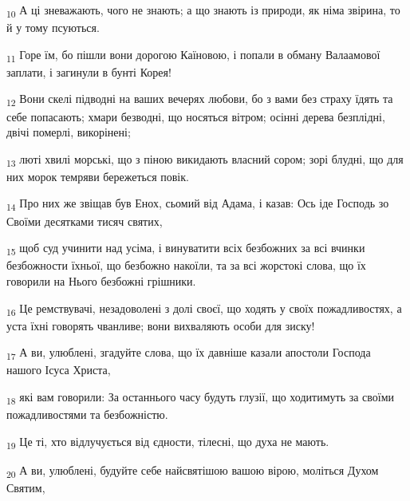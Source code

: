 \begin{tcolorbox}
\textsubscript{10} А ці зневажають, чого не знають; а що знають із природи, як німа звірина, то й у тому псуються.
\end{tcolorbox}
\begin{tcolorbox}
\textsubscript{11} Горе їм, бо пішли вони дорогою Каїновою, і попали в обману Валаамової заплати, і загинули в бунті Корея!
\end{tcolorbox}
\begin{tcolorbox}
\textsubscript{12} Вони скелі підводні на ваших вечерях любови, бо з вами без страху їдять та себе попасають; хмари безводні, що носяться вітром; осінні дерева безплідні, двічі померлі, викорінені;
\end{tcolorbox}
\begin{tcolorbox}
\textsubscript{13} люті хвилі морські, що з піною викидають власний сором; зорі блудні, що для них морок темряви бережеться повік.
\end{tcolorbox}
\begin{tcolorbox}
\textsubscript{14} Про них же звіщав був Енох, сьомий від Адама, і казав: Ось іде Господь зо Своїми десятками тисяч святих,
\end{tcolorbox}
\begin{tcolorbox}
\textsubscript{15} щоб суд учинити над усіма, і винуватити всіх безбожних за всі вчинки безбожности їхньої, що безбожно накоїли, та за всі жорстокі слова, що їх говорили на Нього безбожні грішники.
\end{tcolorbox}
\begin{tcolorbox}
\textsubscript{16} Це ремствувачі, незадоволені з долі своєї, що ходять у своїх пожадливостях, а уста їхні говорять чванливе; вони вихваляють особи для зиску!
\end{tcolorbox}
\begin{tcolorbox}
\textsubscript{17} А ви, улюблені, згадуйте слова, що їх давніше казали апостоли Господа нашого Ісуса Христа,
\end{tcolorbox}
\begin{tcolorbox}
\textsubscript{18} які вам говорили: За останнього часу будуть глузії, що ходитимуть за своїми пожадливостями та безбожністю.
\end{tcolorbox}
\begin{tcolorbox}
\textsubscript{19} Це ті, хто відлучується від єдности, тілесні, що духа не мають.
\end{tcolorbox}
\begin{tcolorbox}
\textsubscript{20} А ви, улюблені, будуйте себе найсвятішою вашою вірою, моліться Духом Святим,
\end{tcolorbox}
